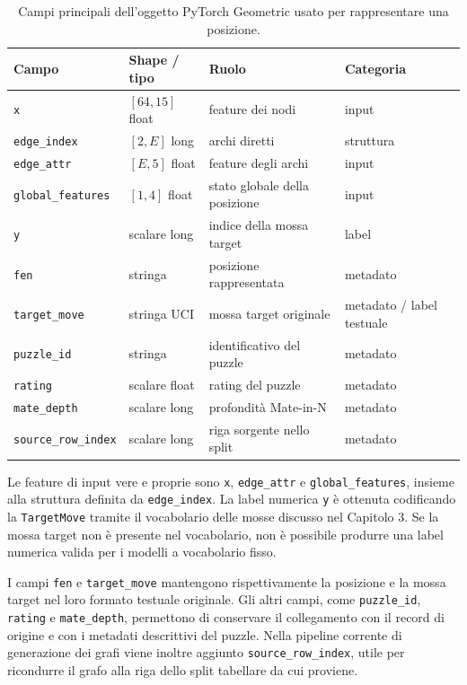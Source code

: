 \begin{table}[htbp]
    \centering
    \small
    \begin{tabularx}{\textwidth}{>{\raggedright\arraybackslash}p{}>{\raggedright\arraybackslash}p{}>{\raggedright\arraybackslash}X>{\raggedright\arraybackslash}p{}}
        \hline
        Campo & Shape / tipo & Ruolo & Categoria \\
        \hline
        \texttt{x} & \([64,15]\) float & feature dei nodi & input \\
        \texttt{edge\_index} & \([2,E]\) long & archi diretti & struttura \\
        \texttt{edge\_attr} & \([E,5]\) float & feature degli archi & input \\
        \texttt{global\_features} & \([1,4]\) float & stato globale della posizione & input \\
        \texttt{y} & scalare long & indice della mossa target & label \\
        \texttt{fen} & stringa & posizione rappresentata & metadato \\
        \texttt{target\_move} & stringa UCI & mossa target originale & metadato / label testuale \\
        \texttt{puzzle\_id} & stringa & identificativo del puzzle & metadato \\
        \texttt{rating} & scalare float & rating del puzzle & metadato \\
        \texttt{mate\_depth} & scalare long & profondit\`a Mate-in-N & metadato \\
        \texttt{source\_row\_index} & scalare long & riga sorgente nello split & metadato \\
        \hline
    \end{tabularx}
    \caption{Campi principali dell'oggetto PyTorch Geometric usato per rappresentare una posizione.}
    \label{tab:pyg-data-fields}
\end{table}

Le feature di input vere e proprie sono \texttt{x}, \texttt{edge\_attr} e \texttt{global\_features}, insieme alla struttura definita da \texttt{edge\_index}. La label numerica \texttt{y} \`e ottenuta codificando la \texttt{TargetMove} tramite il vocabolario delle mosse discusso nel Capitolo 3. Se la mossa target non \`e presente nel vocabolario, non \`e possibile produrre una label numerica valida per i modelli a vocabolario fisso.

I campi \texttt{fen} e \texttt{target\_move} mantengono rispettivamente la posizione e la mossa target nel loro formato testuale originale. Gli altri campi, come \texttt{puzzle\_id}, \texttt{rating} e \texttt{mate\_depth}, permettono di conservare il collegamento con il record di origine e con i metadati descrittivi del puzzle. Nella pipeline corrente di generazione dei grafi viene inoltre aggiunto \texttt{source\_row\_index}, utile per ricondurre il grafo alla riga dello split tabellare da cui proviene.

